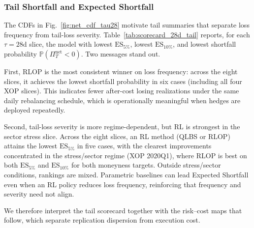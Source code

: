 \subsubsection{Tail Shortfall and Expected Shortfall}
\label{subsubsec:tail_es}

The CDFs in Fig.~\ref{fig:net_cdf_tau28} motivate tail summaries that separate loss frequency from tail-loss severity.
Table~\ref{tab:scorecard_28d_tail} reports, for each $\tau=28$d slice, the model with lowest $\mathrm{ES}_{5\%}$, lowest $\mathrm{ES}_{10\%}$, and lowest shortfall probability $\mathbb{P}(\Pi_T^{\mathrm{net}}<0)$. Two messages stand out.

First, RLOP is the most consistent winner on loss frequency: across the eight slices, it achieves the lowest shortfall probability in six cases (including all four XOP slices). This indicates fewer after-cost losing realizations under the same daily rebalancing schedule, which is operationally meaningful when hedges are deployed repeatedly.

Second, tail-loss severity is more regime-dependent, but RL is strongest in the sector stress slice. Across the eight slices, an RL method (QLBS or RLOP) attains the lowest $\mathrm{ES}_{5\%}$ in five cases, with the clearest improvements concentrated in the stress/sector regime (XOP 2020Q1), where RLOP is best on both $\mathrm{ES}_{5\%}$ and $\mathrm{ES}_{10\%}$ for both moneyness targets. Outside stress/sector conditions, rankings are mixed. Parametric baselines can lead Expected Shortfall even when an RL policy reduces loss frequency, reinforcing that frequency and severity need not align.

We therefore interpret the tail scorecard together with the risk--cost maps that follow, which separate replication dispersion from execution cost.

